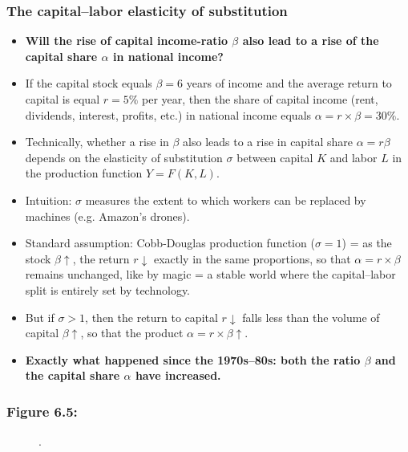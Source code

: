 \documentclass[t]{beamer}\usepackage[]{graphicx}\usepackage[]{color}
\begin{document}
\begin{frame}[label=ElasticityKL,shrink=14]
\frametitle{The capital--labor elasticity of substitution}
\begin{itemize}
\item
\textbf{Will the rise of capital income-ratio $\beta$ also lead to a rise of the capital share $\alpha$ in national income?}
\item
If the capital stock equals $\beta = 6$ years of income and the average return to capital is equal $r = 5\%$ per year, then the share of capital income (rent, dividends, interest, profits, etc.) in national income equals $\alpha = r \times \beta = 30\%$.
\item
Technically, whether a rise in $\beta$ also leads to a rise in capital share $\alpha = r \beta$ depends on the elasticity of substitution $\sigma$ between capital $K$ and labor $L$ in the production function $Y = F(K, L)$.
\item
Intuition: $\sigma$ measures the extent to which workers can be replaced by machines (e.g. Amazon’s drones).
\item
Standard assumption: Cobb-Douglas production function ($\sigma = 1$) = as the stock $\beta \uparrow$, the return $r \downarrow$ exactly in the same proportions, so that $\alpha = r \times \beta$ remains unchanged, like by magic = a stable world where the capital--labor split is entirely set by technology.
\item
But if $\sigma > 1$, then the return to capital $r \downarrow$ falls less than the volume of capital $\beta\uparrow$, so that the product $\alpha = r \times \beta \uparrow$.
\item
\textbf{Exactly what happened since the 1970s--80s: both the ratio $\beta$ and the capital share $\alpha$ have increased.}
\end{itemize}
\end{frame}


\begin{frame}[label=Figure_6_5]
\frametitle{Figure 6.5: }
\begin{figure}[t]
\begin{minipage}[b]{\textwidth}
\centering

\caption{.}
\end{minipage}
\end{figure}
\end{frame}
\end{document}
